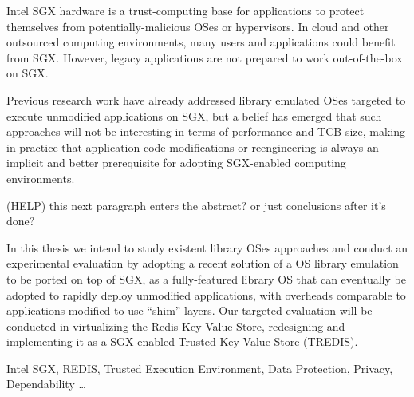 
Intel SGX hardware is a trust-computing base for applications to protect themselves from potentially-malicious OSes or hypervisors. In cloud and other outsourced computing environments, many users and applications could benefit from SGX. 
However, legacy applications are not prepared to work out-of-the-box on SGX. 

Previous research work have already addressed library emulated OSes targeted to execute unmodified applications on SGX, but a belief has emerged that such approaches will not be interesting in terms of performance and TCB size, making in practice that application code modifications or reengineering is always an implicit and better prerequisite for adopting SGX-enabled computing environments. 

(HELP) this next paragraph enters the abstract? or just conclusions after it's done?

In this thesis we intend to study existent library OSes approaches and conduct an experimental evaluation by adopting a recent solution of a OS library emulation to be ported on top of SGX, as a fully-featured library OS that can eventually be adopted to rapidly deploy unmodified applications, with overheads comparable to applications modified to use “shim” layers. Our targeted evaluation will be conducted in virtualizing the Redis Key-Value Store, redesigning and implementing it as a SGX-enabled Trusted Key-Value Store (TREDIS).
\begin{keywords}
Intel SGX, REDIS, Trusted Execution Environment, Data Protection, Privacy, Dependability \ldots
\end{keywords} 


